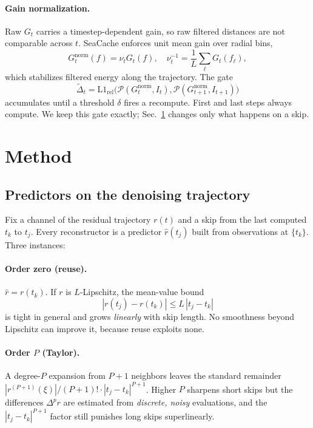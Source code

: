 \documentclass[10pt,twocolumn,letterpaper]{article}
\begin{document}
\paragraph{Gain normalization.}
Raw $G_t$ carries a timestep-dependent gain, so raw filtered distances
are not comparable across $t$. SeaCache enforces unit mean gain over
radial bins,
\begin{equation}
  G_t^{\mathrm{norm}}(f) = \nu_t G_t(f), \quad
  \nu_t^{-1} = \frac{1}{L}\sum_{\ell} G_t(f_\ell),
  \label{eq:norm}
\end{equation}
which stabilizes filtered energy along the trajectory. The gate
\begin{equation}
  \tilde{\Delta}_t = \mathrm{L1_{rel}}\big(
  \mathcal{P}(G_t^{\mathrm{norm}}, I_t),
  \mathcal{P}(G_{t+1}^{\mathrm{norm}}, I_{t+1})\big)
  \label{eq:gate}
\end{equation}
accumulates until a threshold $\delta$ fires a recompute. First and last
steps always compute. We keep this gate exactly; Sec.~\ref{sec:method}
changes only what happens on a skip.

\section{Method}
\label{sec:method}

\subsection{Predictors on the denoising trajectory}
\label{sec:hierarchy}

Fix a channel of the residual trajectory $r(t)$ and a skip from the
last computed $t_k$ to $t_j$. Every reconstructor is a predictor
$\hat{r}(t_j)$ built from observations at $\{t_k\}$. Three instances:

\paragraph{Order zero (reuse).}
$\hat{r} = r(t_k)$. If $r$ is $L$-Lipschitz, the mean-value bound
\begin{equation}
  |r(t_j) - r(t_k)| \le L\,|t_j - t_k|
  \label{eq:reuse}
\end{equation}
is tight in general and grows \emph{linearly} with skip length. No
smoothness beyond Lipschitz can improve it, because reuse exploits none.

\paragraph{Order $P$ (Taylor).}
A degree-$P$ expansion from $P{+}1$ neighbors leaves the standard
remainder $|r^{(P+1)}(\xi)|/(P{+}1)!\cdot|t_j-t_k|^{P+1}$.
Higher $P$ sharpens short skips but the differences
$\Delta^p r$ are estimated from \emph{discrete, noisy} evaluations, and
the $|t_j-t_k|^{P+1}$ factor still punishes long skips superlinearly.
\end{document}
